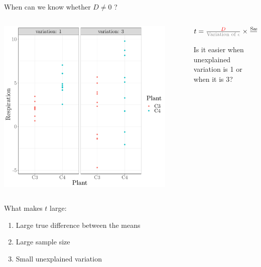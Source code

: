 \documentclass[10pt]{beamer}
\begin{document}
\begin{frame}{When can we know whether $D \neq 0$ ?}

 \begin{columns}
 \begin{column}{0.5\textwidth}
 \includegraphics[width=0.9\textwidth]{Figures/figure/ttestvar-1}
 \end{column}
 \begin{column}{0.5\textwidth}
  $ t = \frac{\color{red}{D}}{\text{\color{gray}{Variation of }}\color{gray}{\epsilon}} \times \frac{\text{Sample Size}}{\sqrt{2}}$

  \vspace{1cm}
  Is it easier when unexplained variation is 1 or when it is 3?
 \end{column}
 \end{columns}
 
 \pause
 \begin{alertblock}{What makes $t$ large:}
  \begin{enumerate}
   \item Large true difference between the means
   \item Large sample size
   \item Small unexplained variation
  \end{enumerate}
 \end{alertblock}

\end{frame}
\end{document}
